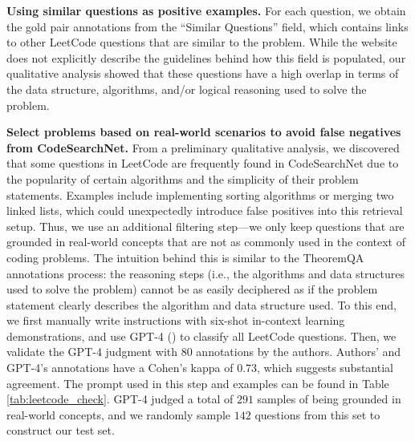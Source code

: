 \textbf{Using similar questions as positive examples.}
For each question, we obtain the gold pair annotations from the ``Similar Questions'' field, which contains links to other LeetCode questions that are similar to the problem.
While the website does not explicitly describe the guidelines behind how this field is populated, our qualitative analysis showed that these questions have a high overlap in terms of the data structure, algorithms, and/or logical reasoning used to solve the problem.

\textbf{Select problems based on real-world scenarios to avoid false negatives from CodeSearchNet.} From a preliminary qualitative analysis, we discovered that some questions in LeetCode are frequently found in CodeSearchNet due to the popularity of certain algorithms and the simplicity of their problem statements. Examples include implementing sorting algorithms or merging two linked lists, which could unexpectedly introduce false positives into this retrieval setup. Thus, we use an additional filtering step---we only keep questions that are grounded in real-world concepts that are not as commonly used in the context of coding problems. 
The intuition behind this is similar to the TheoremQA annotations process: the reasoning steps (i.e., the algorithms and data structures used to solve the problem) cannot be as easily deciphered as if the problem statement clearly describes the algorithm and data structure used.
To this end, we first manually write instructions with six-shot in-context learning demonstrations, and use GPT-4 () to classify all LeetCode questions.
Then, we validate the GPT-4 judgment with 80 annotations by the authors.
Authors' and GPT-4's annotations have a Cohen's kappa of $0.73$, which suggests substantial agreement.
The prompt used in this step and examples can be found in Table \ref{tab:leetcode_check}. GPT-4 judged a total of $291$ samples of being grounded in real-world concepts, and we randomly sample $142$ questions from this set to construct our test set.

